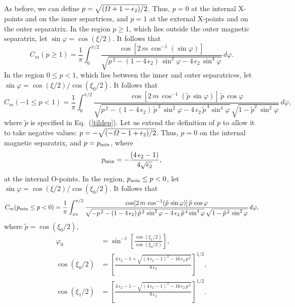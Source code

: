 \documentclass[12pt,prb,aps]{revtex4-1}
\begin{document}
As before, we can define $p=\sqrt{({\mit\Omega}+1-\epsilon_2)/2}$.  Thus, $p=0$ at the internal X-points and on the inner separtrices, and $p=1$ at the external
X-points and on the outer separatrix. In the region $p\geq1$, which lies outside the outer magnetic separatrix, let 
$\sin\varphi = \cos(\xi/2)$. 
It follows that 
\begin{equation}
 C_m(p\geq 1)=\frac{1}{\pi} \int_{0}^{\pi/2}\frac{\cos[2\,m\,\cos^{-1}(\sin\varphi)]}
 {\sqrt{p^{\,2}-(1-4\,\epsilon_2)\,\sin^2\varphi-4\,\epsilon_2\,\sin^4\varphi}}\,d\varphi.
\end{equation}
In the region $0\leq p< 1$, which lies between the inner and outer separatrices, let 
$\sin\varphi = \cos(\xi/2)/\cos(\xi_0/2)$.
 It follows that 
\begin{equation}
 C_m(-1\leq p< 1)=\frac{1}{\pi} \int_{0}^{\pi/2}\frac{\cos[2\,m\,\cos^{-1}(\tilde{p}\,\sin\varphi)]\,\tilde{p}\,\cos\varphi}
 {\sqrt{p^{\,2}-(1-4\,\epsilon_2)\,\tilde{p}^{\,2}\,\sin^2\varphi-4\,\epsilon_2\,\tilde{p}^{\,4}\sin^4\varphi}\,\sqrt{1-\tilde{p}^2\,\sin^2\varphi}}\,d\varphi,
\end{equation}
where $\tilde{p}$ is specified in Eq.~(\ref{tildep}). 
Let us extend the definition of $p$ to allow it to take negative values: $p=-\sqrt{(-{\mit\Omega}-1+\epsilon_2)/2}$. Thus,
$p=0$ on the internal magnetic separatrix, and $p=p_{\rm min}$, 
where
\begin{equation}
p_{\rm min} = - \frac{(4\,\epsilon_2-1)}{4\sqrt{\epsilon_2}},
\end{equation}
at the internal O-points. In the region, $p_{\rm min}\leq p <0$, let $\sin\varphi = \cos(\xi/2)/\cos(\xi_0/2)$.  It follows that 
\begin{equation} C_m(p_{\rm min}\leq p< 0)=\frac{1}{\pi} \int_{\varphi_0}^{\pi/2}\frac{\cos[2\,m\,\cos^{-1}(\tilde{p}\,\sin\varphi)]\,\tilde{p}\,\cos\varphi}
 {\sqrt{-p^{\,2}-(1-4\,\epsilon_2)\,\tilde{p}^{\,2}\,\sin^2\varphi-4\,\epsilon_2\,\tilde{p}^{\,4}\sin^4\varphi}\,\sqrt{1-\tilde{p}^{\,2}\,\sin^2\varphi}}\,d\varphi,
\end{equation}
where $\tilde{p}=\cos(\xi_0/2)$, 
\begin{align}
\varphi_0 &= \sin^{-1}\left[\frac{\cos(\xi_1/2)}{\cos(\xi_0/2)}\right],\\[0.5ex]
 \cos(\xi_0/2)& = \left[\frac{4\,\epsilon_2-1+\sqrt{(4\,\epsilon_2-1)^2-16\,\epsilon_2\,p^{\,2}}}{8\,\epsilon_2}\right]^{1/2},\\[0.5ex]
 \cos(\xi_1/2)& = \left[\frac{4\,\epsilon_2-1-\sqrt{(4\,\epsilon_2-1)^2-16\,\epsilon_2\,p^{\,2}}}{8\,\epsilon_2}\right]^{1/2}.
\end{align}
\end{document}
